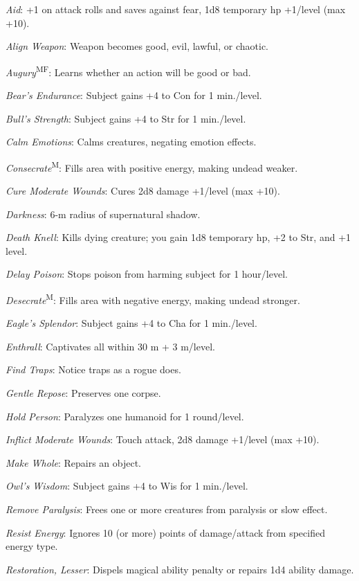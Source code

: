 \textit{Aid}: +1 on attack rolls and saves against fear, 1d8 temporary hp +1/level (max +10).

\textit{Align Weapon}: Weapon becomes good, evil, lawful, or chaotic.

\textit{Augury}\textsuperscript{MF}: Learns whether an action will be good or bad.

\textit{Bear's Endurance}: Subject gains +4 to Con for 1 min./level.

\textit{Bull's Strength}: Subject gains +4 to Str for 1 min./level.

\textit{Calm Emotions}: Calms creatures, negating emotion effects.

\textit{Consecrate}\textsuperscript{M}: Fills area with positive energy, making undead weaker.

\textit{Cure Moderate Wounds}: Cures 2d8 damage +1/level (max +10).

\textit{Darkness}: 6-m radius of supernatural shadow.

\textit{Death Knell}: Kills dying creature; you gain 1d8 temporary hp, +2 to Str, and +1 level.

\textit{Delay Poison}: Stops poison from harming subject for 1 hour/level.

\textit{Desecrate}\textsuperscript{M}: Fills area with negative energy, making undead stronger.

\textit{Eagle's Splendor}: Subject gains +4 to Cha for 1 min./level.

\textit{Enthrall}: Captivates all within 30 m + 3 m/level.

\textit{Find Traps}: Notice traps as a rogue does.

\textit{Gentle Repose}: Preserves one corpse.

\textit{Hold Person}: Paralyzes one humanoid for 1 round/level.

\textit{Inflict Moderate Wounds}: Touch attack, 2d8 damage +1/level (max +10).

\textit{Make Whole}: Repairs an object.

\textit{Owl's Wisdom}: Subject gains +4 to Wis for 1 min./level.

\textit{Remove Paralysis}: Frees one or more creatures from paralysis or slow effect.

\textit{Resist Energy}: Ignores 10 (or more) points of damage/attack from specified energy type.

\textit{Restoration, Lesser}: Dispels magical ability penalty or repairs 1d4 ability damage.

